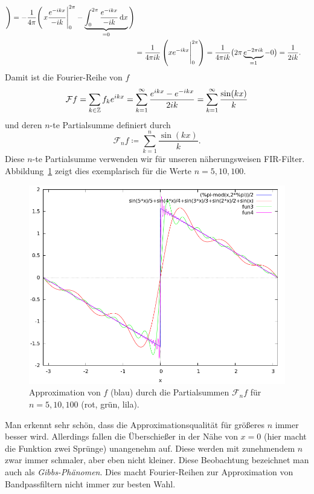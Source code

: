 \begin{example}
\begin{align*}
    \Bigg)
 = -\frac{1}{4\pi} \Bigg( 
      \eval{ x\frac{e^{-ikx}}{-ik} }_{0}^{2\pi} - 
        \underbrace{ \int_{0}^{2\pi} \frac{e^{-ikx}}{-ik} \dif x }_{= 0}
    \Bigg) \\
&= \frac{1}{4\pi ik} \left( \eval{ xe^{-ikx} }_{0}^{2\pi} \right) 
 = \frac{1}{4\pi ik} \big( 2\pi \underbrace{ e^{-2\pi ik} }_{= 1} - 0 \big)
 = \frac{1}{2ik}.
\end{align*}
Damit ist die Fourier-Reihe von $ f $
\[
    \mathcal{F}f 
  = \sum_{k \in \mathbb{Z}} f_{k} e^{ikx}
  = \sum_{k = 1}^{\infty} \frac{e^{ikx} - e^{-ikx}}{2ik}
  = \sum_{k = 1}^{\infty} \frac{\sin(kx)}{k}
\]
und deren $ n $-te Partialsumme definiert durch
\[
  \mathcal{F}_{n}f \coloneqq \sum_{k = 1}^{n} \frac{\sin(kx)}{k}.
\]
Diese $ n $-te Partialsumme verwenden wir für unseren näherungsweisen FIR-Filter. 
Abbildung~\ref{fig:sawtooth_fourier} zeigt dies exemplarisch für die Werte $ n = 5, 10, 100 $.
\begin{figure}[ht]
\centering
\includegraphics[width=0.5\linewidth]{Bilder/sawtooth_fourier}
\caption{Approximation von $ f $ (blau) durch die Partialsummen $ \mathcal{F}_{n}f $ für $ n = 5, 
10, 100 $ (rot, grün, lila).}
\label{fig:sawtooth_fourier}
\end{figure}
Man erkennt sehr schön, dass die Approximationsqualität für größeres $ n $ immer besser wird.
Allerdings fallen die Überschießer in der Nähe von $ x = 0 $ (hier macht die Funktion zwei Sprünge) 
unangenehm auf. Diese werden mit zunehmendem $ n $ zwar immer schmaler, aber eben nicht kleiner.
Diese Beobachtung bezeichnet man auch als \emph{Gibbs-Phänomen}. Dies macht Fourier-Reihen zur 
Approximation von Bandpassfiltern nicht immer zur besten Wahl.


\end{example}
